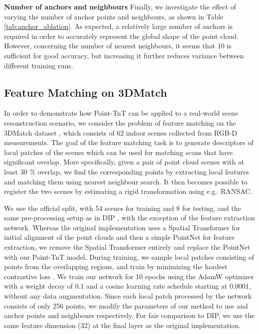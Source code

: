 \documentclass[a4paper,conference]{IEEEtran}
\begin{document}
\noindent \textbf{Number of anchors and neighbours} Finally, we investigate the effect of varying the number of anchor points and neighbours, as shown in Table \ref{tab:anchor_ablation}. As expected, a relatively large number of anchors is required in order to accurately represent the global shape of the point cloud. However, concerning the number of nearest neighbours, it seems that 10 is sufficient for good accuracy, but increasing it further reduces variance between different training runs.


\subsection{Feature Matching on 3DMatch}

In order to demonstrate how Point-TnT can be applied to a real-world scene resonstruction scenario, we consider the problem of feature matching on the 3DMatch dataset \cite{zeng20173dmatch}, which consists of 62 indoor scenes collected from RGB-D measurements. The goal of the feature matching task is to generate descriptors of local patches of the scenes which can be used for matching scans that have significant overlap. More specifically, given a pair of point cloud scenes  with at least 30 \% overlap, we find the corresponding points by extracting local features and matching them using nearest neighbour search. It then becomes possible to register the two scenes by estimating a rigid transformation using e.g.\ RANSAC.

We use the official split, with 54 scenes for training and 8 for testing, and the same pre-processing setup as in DIP \cite{poiesi2021distinctive}, with the exception of the feature extraction network. Whereas the original implementation uses a Spatial Transformer for initial alignment of the point clouds and then a simple PointNet for feature extraction, we remove the Spatial Transformer entirely and replace the PointNet with our Point-TnT model. During training, we sample local patches consisting of  points from the overlapping regions, and train by minimizing the hardest contrastive loss \cite{choy2019fully}. We train our network for 10 epochs using the AdamW optimizer \cite{loshchilov2018decoupled} with a weight decay of 0.1 and a cosine learning rate schedule starting at 0.0001, without any data augmentation. Since each local patch processed by the network consists of only 256 points, we modify the parameters of our method to use  and  anchor points and neighbours respectively. For fair comparison to DIP, we use the same feature dimension (32) at the final layer as the original implementation.
\end{document}
